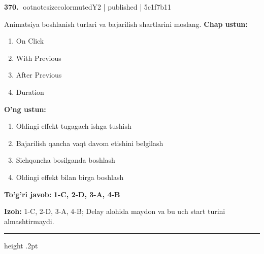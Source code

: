 \documentclass[10pt,a4paper]{article}
\begin{document}
\textbf{\color{ink}370.} {ootnotesizecolor{muted}Y2 | published | 5c1f7b11}
\par
Animatsiya boshlanish turlari va bajarilish shartlarini moslang.
\textbf{Chap ustun:}\begin{enumerate}[label=\arabic*),leftmargin=9mm]
\item On Click
\item With Previous
\item After Previous
\item Duration
\end{enumerate}
\textbf{O'ng ustun:}\begin{enumerate}[label=\Alph*),leftmargin=9mm]
\item Oldingi effekt tugagach ishga tushish
\item Bajarilish qancha vaqt davom etishini belgilash
\item Sichqoncha bosilganda boshlash
\item Oldingi effekt bilan birga boshlash
\end{enumerate}
\begin{tcolorbox}[enhanced,breakable,colback=teal!4,colframe=teal!55!black,boxrule=0.45pt,arc=1.2mm,left=2.8mm,right=2.8mm,top=2mm,bottom=2mm]
\textbf{\color{teal}To'g'ri javob:} \textbf{1-C, 2-D, 3-A, 4-B}
\par\smallskip
\textbf{Izoh:} 1-C, 2-D, 3-A, 4-B; Delay alohida maydon va bu uch start turini almashtirmaydi.
\end{tcolorbox}
\vspace{2mm}\hrule height .2pt\vspace{2mm}
\end{document}
